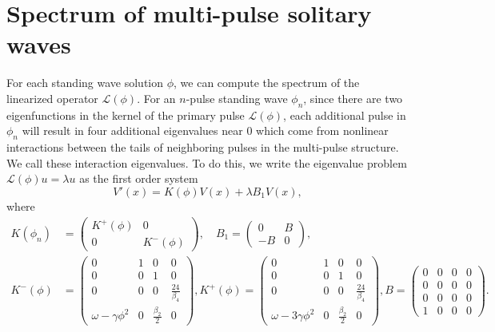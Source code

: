 \documentclass[12pt]{article}
\def\calL{{\mathcal L}}
\begin{document}
\section{Spectrum of multi-pulse solitary waves}\label{sec:multieig}

For each standing wave solution $\phi$, we can compute the spectrum of the linearized operator $\calL(\phi)$. For an $n$-pulse standing wave $\phi_n$, since there are two eigenfunctions in the kernel of the primary pulse $\calL(\phi)$, each additional pulse in $\phi_n$ will result in four additional eigenvalues near 0 which come from nonlinear interactions between the tails of neighboring pulses in the multi-pulse structure. We call these interaction eigenvalues. To do this, we write the eigenvalue problem $\calL(\phi)u = \lambda u$ as the first order system
\begin{equation}\label{multieig}
V'(x) = K(\phi)V(x) + \lambda B_1 V(x),
\end{equation}
where
\begin{align*}
K(\phi_n) &= 
\begin{pmatrix}K^+(\phi) & 0 \\ 0 & K^-(\phi) \end{pmatrix}, \quad
B_1 = \begin{pmatrix}0 & B \\ -B & 0\end{pmatrix}, \\
K^-(\phi) &= \begin{pmatrix}
0 & 1 & 0 & 0 \\
0 & 0 & 1 & 0 \\
0 & 0 & 0 & \frac{24}{\beta_4} \\
\omega - \gamma \phi^2 & 0 & \frac{\beta_2}{2} & 0
\end{pmatrix},
K^+(\phi) = \begin{pmatrix}
0 & 1 & 0 & 0 \\
0 & 0 & 1 & 0 \\
0 & 0 & 0 & \frac{24}{\beta_4} \\
\omega - 3 \gamma \phi^2 & 0 & \frac{\beta_2}{2} & 0
\end{pmatrix},
B = \begin{pmatrix}
0 & 0 & 0 & 0 \\
0 & 0 & 0 & 0 \\
0 & 0 & 0 & 0 \\
1 & 0 & 0 & 0
\end{pmatrix}.
\end{align*}
\end{document}
